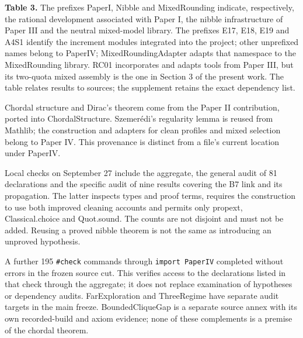 \documentclass[english,11pt,a4paper]{article}
\newcounter{none}
\begin{document}
\textbf{Table 3.} The prefixes {\ttfamily\small PaperI}, {\ttfamily\small Nibble} and {\ttfamily\small MixedRoundin\discretionary{\hbox{\ensuremath{\hookrightarrow}}}{}{}g} indicate, respectively, the rational development associated with Paper I, the nibble infrastructure of Paper III and the neutral mixed-model library. The prefixes {\ttfamily\small E17}, {\ttfamily\small E18}, {\ttfamily\small E19} and {\ttfamily\small A4S1} identify the increment modules integrated into the project; other unprefixed names belong to {\ttfamily\small PaperIV}; {\ttfamily\small MixedRoundin\discretionary{\hbox{\ensuremath{\hookrightarrow}}}{}{}gAdapter} adapts that namespace to the {\ttfamily\small MixedRoundin\discretionary{\hbox{\ensuremath{\hookrightarrow}}}{}{}g} library. RC01 incorporates and adapts tools from Paper III, but its two-quota mixed assembly is the one in Section 3 of the present work. The table relates results to sources; the supplement retains the exact dependency list.

Chordal structure and Dirac's theorem come from the Paper II contribution, ported into {\ttfamily\small ChordalStruc\discretionary{\hbox{\ensuremath{\hookrightarrow}}}{}{}ture}. Szemerédi's regularity lemma is reused from Mathlib; the construction and adapters for clean profiles and mixed selection belong to Paper IV. This provenance is distinct from a file's current location under {\ttfamily\small PaperIV}.

Local checks on September 27 include the aggregate, the general audit of 81 declarations and the specific audit of nine results covering the B7 link and its propagation. The latter inspects types and proof terms, requires the construction to use both improved cleaning accounts and permits only {\ttfamily\small propext}, {\ttfamily\small Classical.\discretionary{\hbox{\ensuremath{\hookrightarrow}}}{}{}choice} and {\ttfamily\small Quot.\discretionary{\hbox{\ensuremath{\hookrightarrow}}}{}{}sound}. The counts are not disjoint and must not be added. Reusing a proved nibble theorem is not the same as introducing an unproved hypothesis.

A further 195 \nolinkurl{\#check} commands through \texttt{import\ PaperIV} completed without errors in the frozen source cut. This verifies access to the declarations listed in that check through the aggregate; it does not replace examination of hypotheses or dependency audits. {\ttfamily\small FarExplorati\discretionary{\hbox{\ensuremath{\hookrightarrow}}}{}{}on} and {\ttfamily\small ThreeRegime} have separate audit targets in the main freeze. {\ttfamily\small BoundedCliqu\discretionary{\hbox{\ensuremath{\hookrightarrow}}}{}{}eGap} is a separate source annex with its own recorded-build and axiom evidence; none of these complements is a premise of the chordal theorem.
\end{document}
